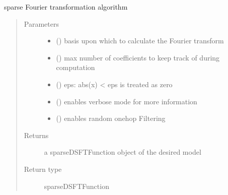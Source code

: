 \documentclass[letterpaper,10pt,english]{sphinxmanual}
\begin{document}
\begin{fulllineitems}
\begin{fulllineitems}
\label{\detokenize{setFTs:setFTs.setfunctions.WrapSignal.transform_sparse}}
\sphinxAtStartPar
sparse Fourier transformation algorithm
\begin{quote}\begin{description}
\item[{Parameters}] \leavevmode\begin{itemize}
\item {} 
\sphinxAtStartPar
{} () \textendash{} basis upon which to calculate the Fourier transform

\item {} 
\sphinxAtStartPar
{} () \textendash{} max number of coefficients to keep track of during computation

\item {} 
\sphinxAtStartPar
{} () \textendash{} eps: abs(x) \textless{} eps is treated as zero

\item {} 
\sphinxAtStartPar
{} () \textendash{} enables verbose mode for more information

\item {} 
\sphinxAtStartPar
{} () \textendash{} enables random one\sphinxhyphen{}hop Filtering

\end{itemize}

\item[{Returns}] \leavevmode
\sphinxAtStartPar
a sparseDSFTFunction object of the desired model

\item[{Return type}] \leavevmode
\sphinxAtStartPar
sparseDSFTFunction

\end{description}\end{quote}

\end{fulllineitems}


\end{fulllineitems}
\end{document}
